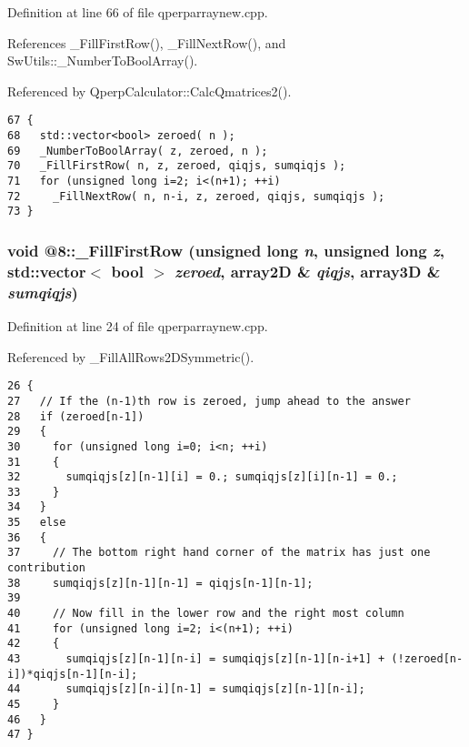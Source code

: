 Definition at line 66 of file qperparraynew.cpp.

References \_\-FillFirstRow(), \_\-FillNextRow(), and SwUtils::\_\-NumberToBoolArray().

Referenced by QperpCalculator::CalcQmatrices2().

\begin{Code}\begin{verbatim}67 {
68   std::vector<bool> zeroed( n );
69   _NumberToBoolArray( z, zeroed, n ); 
70   _FillFirstRow( n, z, zeroed, qiqjs, sumqiqjs );
71   for (unsigned long i=2; i<(n+1); ++i)
72     _FillNextRow( n, n-i, z, zeroed, qiqjs, sumqiqjs );
73 }
\end{verbatim}
\end{Code}


\subsubsection{\setlength{\rightskip}{0pt plus 5cm}void @8::\_\-FillFirstRow (unsigned long {\em n}, unsigned long {\em z}, std::vector$<$ bool $>$ {\em zeroed}, array2D \& {\em qiqjs}, array3D \& {\em sumqiqjs})\hspace{0.3cm}{\tt  [static]}}\label{qperparraynew_8cpp_2038a405262755765309ef166e170a95}




Definition at line 24 of file qperparraynew.cpp.

Referenced by \_\-FillAllRows2DSymmetric().

\begin{Code}\begin{verbatim}26 {
27   // If the (n-1)th row is zeroed, jump ahead to the answer
28   if (zeroed[n-1])
29   {
30     for (unsigned long i=0; i<n; ++i)
31     {
32       sumqiqjs[z][n-1][i] = 0.; sumqiqjs[z][i][n-1] = 0.;
33     }
34   }
35   else
36   {
37     // The bottom right hand corner of the matrix has just one contribution
38     sumqiqjs[z][n-1][n-1] = qiqjs[n-1][n-1];
39 
40     // Now fill in the lower row and the right most column
41     for (unsigned long i=2; i<(n+1); ++i)
42     {
43       sumqiqjs[z][n-1][n-i] = sumqiqjs[z][n-1][n-i+1] + (!zeroed[n-i])*qiqjs[n-1][n-i];
44       sumqiqjs[z][n-i][n-1] = sumqiqjs[z][n-1][n-i];
45     }
46   }
47 }
\end{verbatim}
\end{Code}



